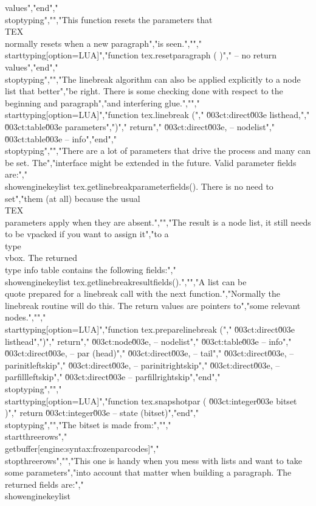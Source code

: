 values","end","\\stoptyping","","This function resets the parameters that \\TEX\\ normally resets when a new paragraph","is seen.","","\\starttyping[option=LUA]","function tex.resetparagraph ( )","    -- no return values","end","\\stoptyping","","The linebreak algorithm can also be applied explicitly to a node list that better","be right. There is some checking done with respect to the beginning and paragraph","and interfering glue.","","\\starttyping[option=LUA]","function tex.linebreak (","    \u003ct:direct\u003e listhead,","    \u003ct:table\u003e  parameters",")","    return","        \u003ct:direct\u003e, -- nodelist","        \u003ct:table\u003e   -- info","end","\\stoptyping","","There are a lot of parameters that drive the process and many can be set. The","interface might be extended in the future. Valid parameter fields are:","\\showenginekeylist {tex.getlinebreakparameterfields()}. There is no need to set","them (at all) because the usual \\TEX\\ parameters apply when they are absent.","","The result is a node list, it still needs to be vpacked if you want to assign it","to a \\type {\\vbox}. The returned \\type {info} table contains the following fields:","\\showenginekeylist {tex.getlinebreakresultfields()}.","","A list can be \\quote {prepared} for a linebreak call with the next function.","Normally the linebreak routine will do this. The return values are pointers to","some relevant nodes.","","\\starttyping[option=LUA]","function tex.preparelinebreak (","    \u003ct:direct\u003e  listhead",")","    return","        \u003ct:node\u003e, -- nodelist","        \u003ct:table\u003e -- info","        \u003ct:direct\u003e, -- par (head)","        \u003ct:direct\u003e, -- tail","        \u003ct:direct\u003e, -- parinitleftskip","        \u003ct:direct\u003e, -- parinitrightskip","        \u003ct:direct\u003e, -- parfillleftskip","        \u003ct:direct\u003e  -- parfillrightskip","end","\\stoptyping","","\\starttyping[option=LUA]","function tex.snapshotpar ( \u003ct:integer\u003e bitset )","    return \u003ct:integer\u003e -- state (bitset)","end","\\stoptyping","","The bitset is made from:","","\\startthreerows","\\getbuffer[engine:syntax:frozenparcodes]","\\stopthreerows","","This one is handy when you mess with lists and want to take some parameters","into account that matter when building a paragraph. The returned fields are:","\\showenginekeylist 